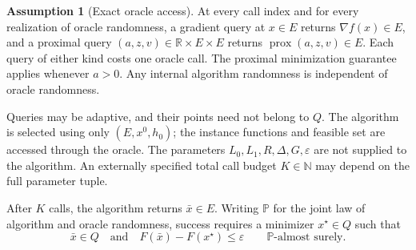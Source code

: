 \documentclass[10pt]{article}
\theoremstyle{definition}
\newtheorem{assumption}{Assumption}
\begin{document}
\begin{assumption}[Exact oracle access]
At every call index and for every realization of oracle randomness, a gradient query at $x\in E$ returns $\nabla f(x)\in E$, and a proximal query $(a,z,v)\in\mathbb{R}\times E\times E$ returns $\operatorname{prox}(a,z,v)\in E$. Each query of either kind costs one oracle call. The proximal minimization guarantee applies whenever $a>0$. Any internal algorithm randomness is independent of oracle randomness.
\end{assumption}

Queries may be adaptive, and their points need not belong to $Q$. The algorithm is selected using only $(E,x^0,h_0)$; the instance functions and feasible set are accessed through the oracle. The parameters $L_0,L_1,R,\Delta,G,\varepsilon$ are not supplied to the algorithm. An externally specified total call budget $K\in\mathbb{N}$ may depend on the full parameter tuple.

After $K$ calls, the algorithm returns $\bar{x}\in E$. Writing $\mathbb{P}$ for the joint law of algorithm and oracle randomness, success requires a minimizer $x^\star\in Q$ such that
\[
\bar{x}\in Q
\quad\text{and}\quad
F(\bar{x})-F(x^\star)\leq\varepsilon
\qquad\mathbb{P}\text{-almost surely}.
\]
\end{document}
